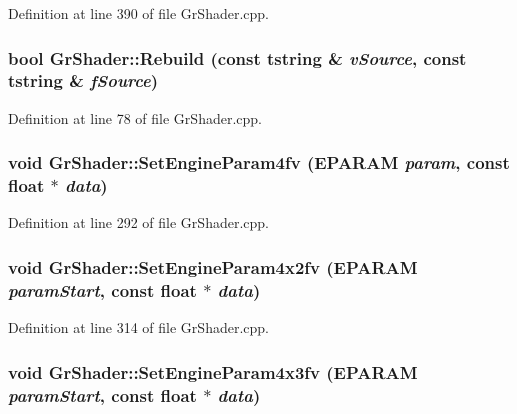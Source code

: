\begin{CompactItemize}
Definition at line 390 of file GrShader.cpp.\hypertarget{class_gr_shader_f9ce91e69a32ecd1ec6aa457c5fff942}{
\subsubsection[{Rebuild}]{\setlength{\rightskip}{0pt plus 5cm}bool GrShader::Rebuild (const {\bf tstring} \& {\em vSource}, \/  const {\bf tstring} \& {\em fSource})}}
\label{class_gr_shader_f9ce91e69a32ecd1ec6aa457c5fff942}




Definition at line 78 of file GrShader.cpp.\hypertarget{class_gr_shader_151b6e0ff7c3e9fa37c5bc2498e752fe}{
\subsubsection[{SetEngineParam4fv}]{\setlength{\rightskip}{0pt plus 5cm}void GrShader::SetEngineParam4fv ({\bf EPARAM} {\em param}, \/  const float $\ast$ {\em data})}}
\label{class_gr_shader_151b6e0ff7c3e9fa37c5bc2498e752fe}




Definition at line 292 of file GrShader.cpp.\hypertarget{class_gr_shader_ba8fee7b0196c1585178d3248e7cc7ca}{
\subsubsection[{SetEngineParam4x2fv}]{\setlength{\rightskip}{0pt plus 5cm}void GrShader::SetEngineParam4x2fv ({\bf EPARAM} {\em paramStart}, \/  const float $\ast$ {\em data})}}
\label{class_gr_shader_ba8fee7b0196c1585178d3248e7cc7ca}




Definition at line 314 of file GrShader.cpp.\hypertarget{class_gr_shader_8566055ca06bc953e0b58f6856b07a2b}{
\subsubsection[{SetEngineParam4x3fv}]{\setlength{\rightskip}{0pt plus 5cm}void GrShader::SetEngineParam4x3fv ({\bf EPARAM} {\em paramStart}, \/  const float $\ast$ {\em data})}}
\label{class_gr_shader_8566055ca06bc953e0b58f6856b07a2b}





\end{CompactItemize}
